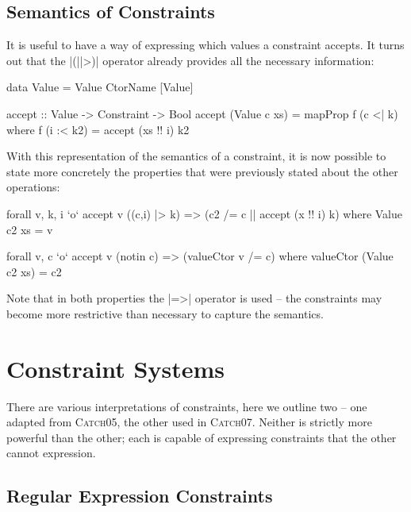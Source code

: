 \documentclass[preprint]{sigplanconf}
\newcommand{\catch}{\textsc{Catch}}
\begin{document}
\subsection{Semantics of Constraints}

It is useful to have a way of expressing which values a constraint accepts. It turns out that the |(||>)| operator already provides all the necessary information:

\begin{code}
data Value = Value CtorName [Value]

accept :: Value -> Constraint -> Bool
accept (Value c xs) = mapProp f (c <| k)
    where f (i :< k2) = accept (xs !! i) k2
\end{code}

With this representation of the semantics of a constraint, it is now possible to state more concretely the properties that were previously stated about the other operations:

\begin{code}
forall v, k, i `o` accept v ((c,i) |> k) => (c2 /= c || accept (x !! i) k)
    where Value c2 xs = v

forall v, c `o` accept v (notin c) => (valueCtor v /= c)
    where valueCtor (Value c2 xs) = c2
\end{code}

Note that in both properties the |=>| operator is used -- the constraints may become more restrictive than necessary to capture the semantics.

\section{Constraint Systems}
\label{sec:constraint}

There are various interpretations of constraints, here we outline two -- one adapted from \catch05, the other used in \catch07. Neither is strictly more powerful than the other; each is capable of expressing constraints that the other cannot expression.

\subsection{Regular Expression Constraints}
\label{sec:regexp}
\end{document}
